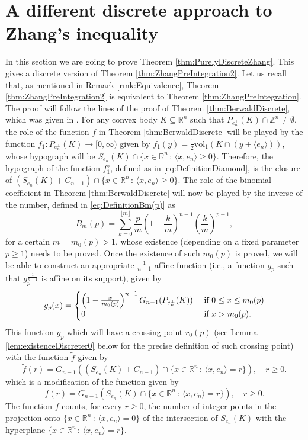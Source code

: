 \documentclass[10pt]{amsart}
\def\R{\mathbb{R}}
\def\Z{\mathbb{Z}}
\def\vol{\mathrm{vol}}
\numberwithin{equation}{section}
\begin{document}
\section{A different discrete approach to Zhang's inequality}\label{sec:AnotherDiscreteApproach}

In this section we are going to prove Theorem \ref{thm:PurelyDiscreteZhang}. This gives a discrete version of Theorem \ref{thm:ZhangPreIntegration2}. Let us recall that, as mentioned in Remark \ref{rmk:Equivalence}, Theorem \ref{thm:ZhangPreIntegration2} is equivalent to Theorem \ref{thm:ZhangPreIntegration}. The proof will follow the lines of the proof of Theorem \ref{thm:BerwaldDiscrete}, which was given in \cite{ALY}. For any convex body $K\subseteq\R^n$ such that $P_{e_n^\perp}(K)\cap\Z^n\neq\emptyset$, the role of the function $f$ in Theorem \ref{thm:BerwaldDiscrete} will be played by the function $f_1:P_{e_n^\perp}(K)\to[0,\infty)$ given by $f_1(y)=\frac{1}{2}\vol_1(K\cap(y+\langle e_n\rangle))$, whose hypograph will be $S_{e_n}(K)\cap\{x\in\R^n\,:\,\langle x,e_n\rangle\geq0\}$. Therefore, the hypograph of the function $f_1^\diamond$, defined as in \eqref{eq:DefinitionDiamond}, is the closure of $(S_{e_n}(K)+C_{n-1})\cap\{x\in\R^n\,:\,\langle x,e_n\rangle\geq0\}$. The role of the binomial coefficient in Theorem \ref{thm:BerwaldDiscrete} will now be played by the inverse of the number, defined in \eqref{eq:DefinitionBm(p)} as
$$
B_{m}(p)=\sum_{k=0}^{\lfloor m\rfloor}\frac{p}{m}\left(1-\frac{k}{m}\right)^{n-1}\left(\frac{k}{m}\right)^{p-1},
$$
for a certain $m=m_0(p)>1$, whose existence (depending on a fixed parameter $p\geq1$) needs to be proved. Once the existence of such $m_0(p)$ is proved, we will be able to construct an appropriate $\frac{1}{n-1}$-affine function (i.e., a function $g_p$ such that $g_p^\frac{1}{n-1}$ is affine on its support), given by
\begin{equation}\label{eq:Definitiong_p}
g_p(x)=\begin{cases}
\left(1-\frac{x}{m_0(p)}\right)^{n-1}G_{n-1}(P_{e_n^\perp}(K)) &\textrm{ if }0\leq x\leq m_0(p)\cr
0&\textrm{ if }x>m_0(p).\cr
\end{cases}
\end{equation}
This function $g_p$ which will have a crossing point $r_0(p)$ (see Lemma \ref{lem:existenceDiscreter0} below for the precise definition of such crossing point) with the function  $\tilde{f}$ given by
\begin{equation}\label{eq:DefinitionfTilde}
\tilde{f}(r)=G_{n-1}((S_{e_n}(K)+C_{n-1})\cap\{x\in\R^n\,:\,\langle x,e_n\rangle=r\}),\quad r\geq0.
\end{equation}
which is a modification of the function given by
\begin{equation}\label{eq:DefinitionfSinTilde}
f(r)=G_{n-1}(S_{e_n}(K)\cap\{x\in\R^n\,:\,\langle x,e_n\rangle=r\}),\quad r\geq0.
\end{equation}
The function $f$ counts, for every $r\geq0$, the number of integer points in the projection onto $\{x\in\R^n\,:\,\langle x,e_n\rangle=0\}$ of the intersection of $S_{e_n}(K)$ with the hyperplane $\{x\in\R^n\,:\,\langle x,e_n\rangle=r\}$.
\end{document}
